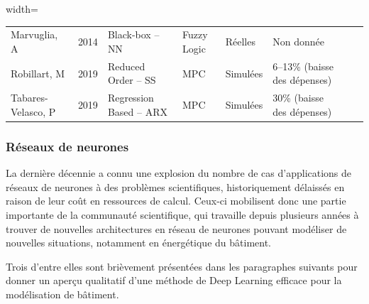 \begin{table}[H]
\begin{adjustbox}{width=\textwidth}
\begin{tabular}{l c l l l l l l}
                        Marvuglia, A        & 2014 & Black-box -- NN               & Fuzzy Logic     & Réelles                & Non donnée                              \\
                        Robillart, M        & 2019 & Reduced Order -- SS            & MPC             & Simulées          & 6--13\% (baisse des dépenses)                   \\
                        Tabares-Velasco, P & 2019 & Regression Based -- ARX        & MPC             & Simulées          & 30\% (baisse des dépenses)                       \\
                        \bottomrule
                    \end{tabular}
                \end{adjustbox}
                \label{tab:control_literature_summary}
            \end{table}

        \subsubsection{Réseaux de neurones}\label{subsubsec:reseaux-de-neurones}
            La dernière décennie a connu une explosion du nombre de cas d'applications de réseaux de
            neurones à des problèmes scientifiques, historiquement délaissés en raison de leur coût en ressources de calcul\cite{LeCun_DL,UDL}.
            Ceux-ci mobilisent donc une partie importante de la communauté scientifique, qui
            travaille depuis plusieurs années à trouver de nouvelles architectures en réseau de
            neurones pouvant modéliser de nouvelles situations, notamment en énergétique du
            bâtiment.

            Trois d'entre elles sont brièvement présentées dans les paragraphes suivants pour donner
            un aperçu qualitatif d'une méthode de Deep Learning efficace pour la modélisation de bâtiment.
